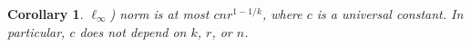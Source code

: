 \documentclass{patmorin}
\newtheorem{corollary}[theorem]{Corollary}
\begin{document}
\begin{corollary}
$\ell_\infty$) norm is at
  most $cnr^{1-1/k}$, where $c$ is a universal constant. In particular,
  $c$ does not depend on $k$, $r$, or $n$.
\end{corollary}
\end{document}
